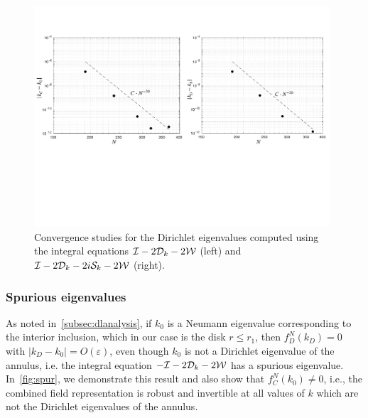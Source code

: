 \begin{figure}
  \centering
  \includegraphics[width=0.98\textwidth]{media/conv-studies.pdf}
  \caption{Convergence studies for the Dirichlet eigenvalues
  computed using the integral equations 
  $\mathcal I - 2{\mathcal D}_{k} - 2{\mathcal W}$ (left) and
  $\mathcal I - 2{\mathcal D}_{k} - 2i {\mathcal S}_{k} - 2{\mathcal W}$ (right).}
  \label{fig:conv}
\end{figure}

\subsubsection{Spurious eigenvalues}
\label{subsec:spurannulus}
As noted in~\cref{subsec:dlanalysis},
if $k_{0}$ is a Neumann eigenvalue corresponding to the interior
inclusion, which in our case is the disk $r\leq r_{1}$, then
$f_{D}^{N}(k_{D}) = 0$ with $|k_{D}-k_{0}| = O(\varepsilon)$, even though $k_{0}$ 
is not a Dirichlet eigenvalue of the annulus, i.e.
the integral equation $-\mathcal I - 2{\mathcal D}_{k} -2{\mathcal W}$ has a spurious eigenvalue.
In~\cref{fig:spur}, we demonstrate this result and also show that 
$f_{C}^{N}(k_{0}) \neq 0$, i.e., the combined field representation is
robust and invertible at all values of $k$ which are not the Dirichlet
eigenvalues of the annulus.

